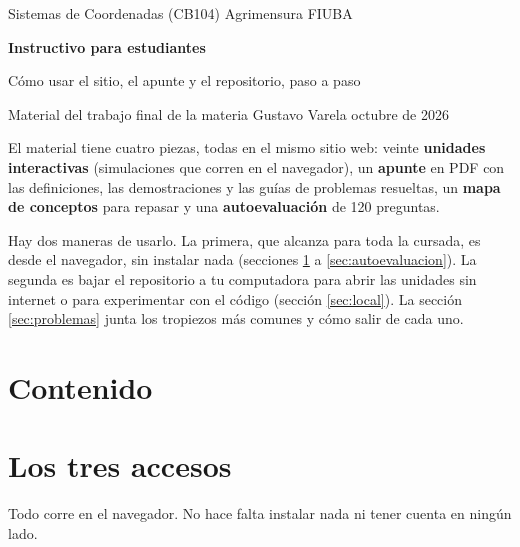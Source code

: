 \documentclass[11pt,a4paper]{report}
\begin{document}
\apunteCuerpotrue

\begin{center}
  {\color{muted}\large Sistemas de Coordenadas (CB104) \textperiodcentered{} Agrimensura \textperiodcentered{} FIUBA}\par\medskip
  {\color{tealdark}\Huge\bfseries Instructivo para estudiantes}\par\medskip
  {\Large Cómo usar el sitio, el apunte y el repositorio, paso a paso}\par\bigskip
  {\color{muted} Material del trabajo final de la materia \textperiodcentered{} Gustavo Varela \textperiodcentered{} octubre de 2026}
\end{center}

\begin{idea}
El material tiene cuatro piezas, todas en el mismo sitio web: veinte \textbf{unidades interactivas} (simulaciones que corren en el navegador), un \textbf{apunte} en PDF con las definiciones, las demostraciones y las guías de problemas resueltas, un \textbf{mapa de conceptos} para repasar y una \textbf{autoevaluación} de 120 preguntas.

Hay dos maneras de usarlo. La primera, que alcanza para toda la cursada, es desde el navegador, sin instalar nada (secciones \ref{sec:accesos} a \ref{sec:autoevaluacion}). La segunda es bajar el repositorio a tu computadora para abrir las unidades sin internet o para experimentar con el código (sección \ref{sec:local}). La sección \ref{sec:problemas} junta los tropiezos más comunes y cómo salir de cada uno.
\end{idea}

\makeatletter
\section*{Contenido}
\makeatother

\section{Los tres accesos}\label{sec:accesos}

Todo corre en el navegador. No hace falta instalar nada ni tener cuenta en ningún lado.
\end{document}

